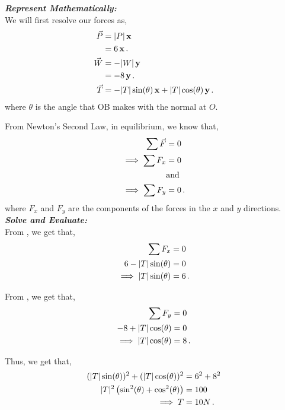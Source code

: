 \begin{subquestions}
\begin{subsubquestions}
\textbf{\textit{Represent Mathematically:}} \\
We will first resolve our forces as,
\begin{align}
	\vec{P} & = |P|\,\mathbf{x} \nonumber \\
	        & = 6\,\mathbf{x} \,. \\
	\vec{W} & = -|W|\,\mathbf{y} \nonumber \\
	        & = -8\,\mathbf{y} \,. \\ 
	\vec{T} & = -|T|\sin(\theta)\,\mathbf{x} + |T|\cos(\theta)\,\mathbf{y} \,.
\end{align}
where $\theta$ is the angle that OB makes with the normal at $O$.

From Newton's Second Law, in equilibrium, we know that,
\begin{align}
	\sum \vec{F} & = 0 \nonumber \\
	\implies \sum F_x & = 0 \label{2010:q6:ForceX} \\
	& \text{and} \nonumber \\
	\implies \sum F_y & = 0 \label{2010:q6:ForceY} \,.
\end{align}
where $F_x$ and $F_y$ are the components of the forces in the $x$ and $y$ directions.\\



\textbf{\textit{Solve and Evaluate:}} \\
From , we get that,
\begin{align}
	\sum F_x & = 0 \nonumber \\
	6 -|T|\sin(\theta) & = 0 \nonumber \\
	\implies |T|\sin(\theta) & = 6 \label{2010:q6:TensEqn1} \,.
\end{align}

From , we get that,
\begin{align}
	\sum F_y & = 0 \nonumber \\
	-8 +|T|\cos(\theta) & = 0 \nonumber \\
	\implies |T|\cos(\theta) & = 8 \,.
\end{align}

Thus, we get that,
\begin{align}
	(|T|\sin(\theta))^2 + (|T|\cos(\theta))^2 & = 6^2 + 8^2 \nonumber \\
	|T|^2 \left(\sin^2(\theta)+\cos^2(\theta)\right) & = 100 \nonumber \\
	\implies T & = 10N \,.
\end{align}
	


\end{subsubquestions}
\end{subquestions}
